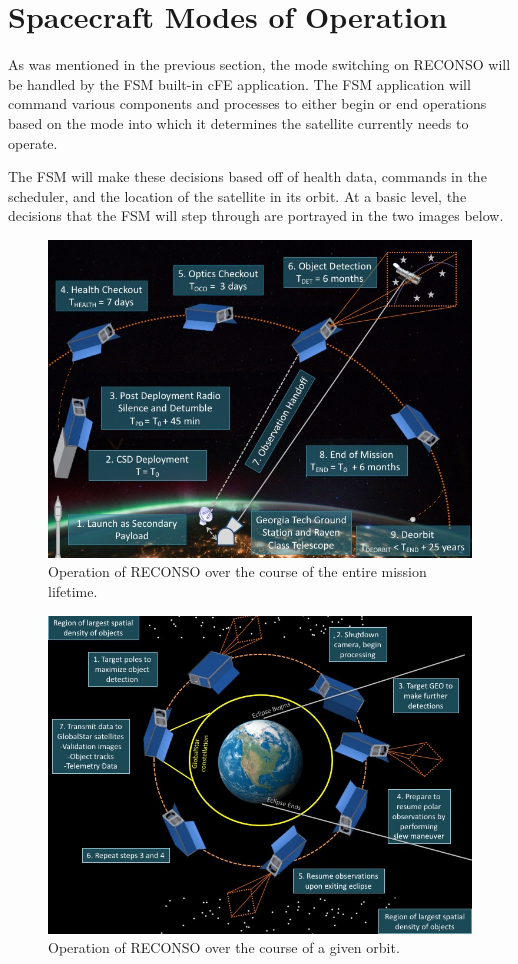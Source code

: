 \documentclass{article}
\begin{document}
\section{Spacecraft Modes of Operation}

As was mentioned in the previous section, the mode switching on RECONSO will be handled by the FSM built-in cFE application. The FSM application will command various components and processes to either begin or end operations based on the mode into which it determines the satellite currently needs to operate. 

The FSM will make these decisions based off of health data, commands in the scheduler, and the location of the satellite in its orbit. At a basic level, the decisions that the FSM will step through are portrayed in the two images below.

\begin{figure}[h!]
\centering
\caption{Operation of RECONSO over the course of the entire mission lifetime.}
\includegraphics[width=.83\textwidth]{OV1.jpg}
\end{figure}

\begin{figure}[h!]
\centering
\caption{Operation of RECONSO over the course of a given orbit.}
\includegraphics[width=.83\textwidth]{OV2.jpg}
\end{figure}
\end{document}
